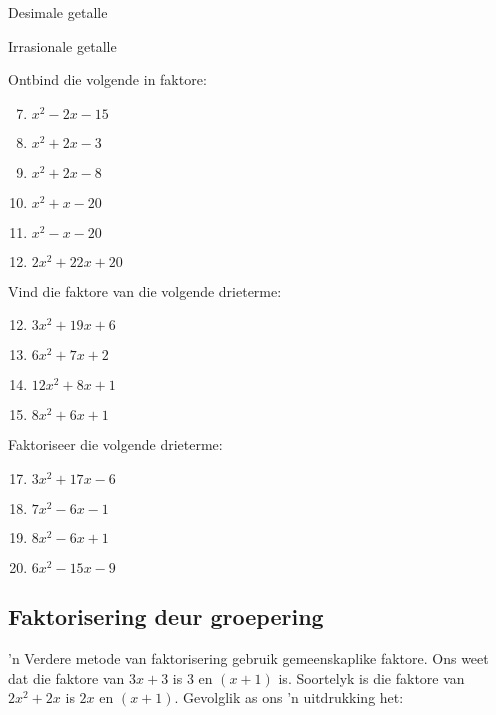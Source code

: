 \begin{Aktiwiteit}{Desimale getalle}
\begin{aktiwiteit}{Irrasionale getalle}
\begin{exercises}{}
{Ontbind die volgende in faktore:
\begin{multicols}{2}
\begin{enumerate}[itemsep=5pt, label=\textbf{\arabic*}. ] 
\setcounter{enumi}{6}
\item ${x}^{2}-2x-15$
\item ${x}^{2}+2x-3$
\item ${x}^{2}+2x-8$
\item ${x}^{2}+x-20$
\item ${x}^{2}-x-20$
\item $2{x}^{2}+22x+20$
\end{enumerate}
\end{multicols}


Vind die faktore van die volgende drieterme:
\begin{multicols}{2}
\begin{enumerate}[itemsep=5pt, label=\textbf{\arabic*}. ] 
\setcounter{enumi}{11}

\item $3{x}^{2}+19x+6$
\item $6{x}^{2}+7x+2$
\item $12{x}^{2}+8x+1$
\item $8{x}^{2}+6x+1$
\end{enumerate}
\end{multicols}

Faktoriseer die volgende drieterme:
\begin{multicols}{2}
\begin{enumerate}[itemsep=5pt, label=\textbf{\arabic*}. ] 
\setcounter{enumi}{16}
\item $3{x}^{2}+17x-6$
\item $7{x}^{2}-6x-1$
\item $8{x}^{2}-6x+1$
\item $6{x}^{2}-15x-9$
\end{enumerate}
\end{multicols}




}
\end{exercises}


\subsection{Faktorisering deur groepering}
\nopagebreak

’n Verdere metode van faktorisering gebruik gemeenskaplike faktore. Ons weet dat die faktore van $3x+3$ is $3$ en $(x+1)$ is. Soortelyk is die faktore van $2{x}^{2}+2x$ is $2x$ en $(x+1)$. Gevolglik as ons ’n uitdrukking het:\par 


\end{aktiwiteit}
\end{Aktiwiteit}
